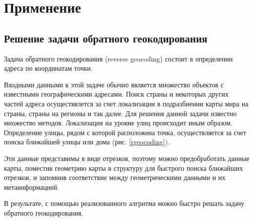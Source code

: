 \chapter{Применение}
\section{Решение задачи обратного геокодирования}
Задача обратного геокодирования (reverse geocoding) состоит в
определении адреса по координатам точки.

Входными данными к этой задаче обычно является множество объектов
с известными географическими адресами. Поиск страны и некоторых других частей
адреса осуществялется за счет локализации в подразбиении карты мира на страны, 
страны на регионы и так далее. Для решения данной задачи известно множество методов.
Локализация на уровне улиц происходит иным образом. Определение улицы, рядом с 
которой расположена точка, осуществляется за счет поиска ближайшей улицы или дома (рис. \ref{rgeocoding}).

Эти данные представимы в виде отрезков, поэтому можно предобработать данные карты,
поместив геометрию карты в структуру для быстрого поиска ближайших отрезков, и запомнив
соответствие между геометрическими данными и их метаинформацией.

В результате, с помощью реализованного алгритма можно быстро решать задачу обратного геокодирования.

